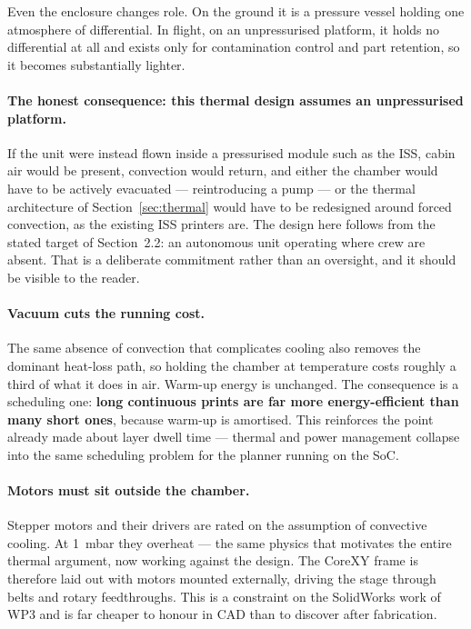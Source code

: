 \documentclass[11pt,a4paper]{article}
\begin{document}
Even the enclosure changes role. On the ground it is a pressure vessel holding
one atmosphere of differential. In flight, on an unpressurised platform, it
holds no differential at all and exists only for contamination control and part
retention, so it becomes substantially lighter.

\paragraph{The honest consequence: this thermal design assumes an unpressurised
platform.} If the unit were instead flown inside a pressurised module such as
the ISS, cabin air would be present, convection would return, and either the
chamber would have to be actively evacuated --- reintroducing a pump --- or the
thermal architecture of Section~\ref{sec:thermal} would have to be redesigned
around forced convection, as the existing ISS printers are. The design here
follows from the stated target of Section~2.2: an autonomous unit operating
where crew are absent. That is a deliberate commitment rather than an oversight,
and it should be visible to the reader.



\paragraph{Vacuum cuts the running cost.} The same absence of convection that
complicates cooling also removes the dominant heat-loss path, so holding the
chamber at temperature costs roughly a third of what it does in air. Warm-up
energy is unchanged. The consequence is a scheduling one: \textbf{long
continuous prints are far more energy-efficient than many short ones}, because
warm-up is amortised. This reinforces the point already made about layer dwell
time --- thermal and power management collapse into the same scheduling problem
for the planner running on the SoC.

\paragraph{Motors must sit outside the chamber.} Stepper motors and their drivers
are rated on the assumption of convective cooling. At \SI{1}{\milli\bar} they
overheat --- the same physics that motivates the entire thermal argument, now
working against the design. The CoreXY frame is therefore laid out with motors
mounted externally, driving the stage through belts and rotary feedthroughs. This
is a constraint on the SolidWorks work of WP3 and is far cheaper to honour in CAD
than to discover after fabrication.
\end{document}
